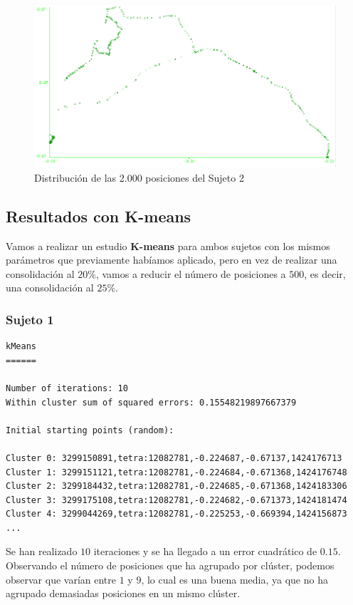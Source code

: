 \documentclass[a4paper, 12pt]{article}
\begin{document}
\begin{figure}[H]
	\includegraphics[scale=.5]{../comparativa/sujeto2.png}
	\caption{Distribuci\'on de las 2.000 posiciones del Sujeto 2}
\end{figure}


\subsection{Resultados con K-means}

Vamos a realizar un estudio \textbf{K-means} para ambos sujetos con los mismos par\'ametros que previamente hab\'iamos aplicado, pero en vez de realizar una consolidaci\'on al $20\%$, vamos a reducir el n\'umero de posiciones a $500$, es decir, una consolidaci\'on al $25\%$. 

\subsubsection{Sujeto 1}

\begin{verbatim}
kMeans
======

Number of iterations: 10
Within cluster sum of squared errors: 0.15548219897667379

Initial starting points (random):

Cluster 0: 3299150891,tetra:12082781,-0.224687,-0.67137,1424176713
Cluster 1: 3299151121,tetra:12082781,-0.224684,-0.671368,1424176748
Cluster 2: 3299184432,tetra:12082781,-0.224685,-0.671368,1424183306
Cluster 3: 3299175108,tetra:12082781,-0.224682,-0.671373,1424181474
Cluster 4: 3299044269,tetra:12082781,-0.225253,-0.669394,1424156873
...
\end{verbatim}

Se han realizado $10$ iteraciones y se ha llegado a un error cuadr\'atico de $0.15$. Observando el n\'umero de posiciones que ha agrupado por cl\'uster, podemos observar que var\'ian entre $1$ y $9$, lo cual es una buena media, ya que no ha agrupado demasiadas posiciones en un mismo cl\'uster. \\ 
\end{document}
